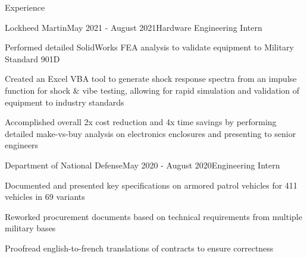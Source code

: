 \documentclass{resume} %
\newenvironment{CVmode}{}{}
\begin{document}
\begin{rSection}{Experience}
\begin{CVmode}
\begin{rSubsection}{Lockheed Martin}{May 2021 - August 2021}{Hardware Engineering Intern}{}

\item Performed detailed SolidWorks FEA analysis to validate equipment to Military Standard 901D
\item Created an Excel VBA tool to generate shock response spectra from an impulse function for shock \& vibe testing, allowing for rapid simulation and validation of equipment to industry standards
\item Accomplished overall 2x cost reduction and 4x time savings by performing detailed make-vs-buy analysis on electronics enclosures and presenting to senior engineers

\end{rSubsection}

\begin{rSubsection}{Department of National Defense}{May 2020 - August 2020}{Engineering Intern}{}

\item Documented and presented key specifications on armored patrol vehicles for 411 vehicles in 69 variants
\item Reworked procurement documents based on technical requirements from multiple military bases
\item Proofread english-to-french translations of contracts to ensure correctness

\end{rSubsection}

\end{CVmode}
\pagebreak
\end{rSection}
\end{document}
